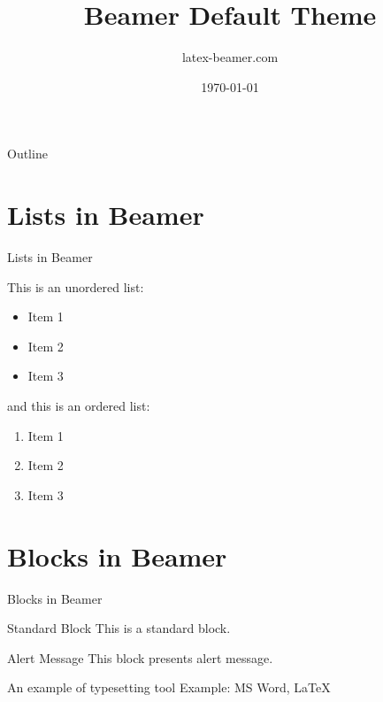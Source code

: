 \documentclass{beamer}
\title{Beamer Default Theme}
\author{latex-beamer.com}
\date{\today}
\begin{document}
\begin{frame}
    \titlepage 
\end{frame}

\logo{}

\begin{frame}{Outline}
    \tableofcontents
\end{frame}

\section{Lists in Beamer}
\begin{frame}{Lists in Beamer}

This is an unordered list:
\begin{itemize}
    \item Item 1
    \item Item 2
    \item Item 3
\end{itemize}

and this is an ordered list:
\begin{enumerate}
    \item Item 1
    \item Item 2
    \item Item 3
\end{enumerate}

\end{frame}

\section{Blocks in Beamer}
\begin{frame}{Blocks in Beamer}
    \begin{block}{Standard Block}
        This is a standard block.
    \end{block}
    \begin{alertblock}{Alert Message}
        This block presents alert message.
    \end{alertblock}
    \begin{exampleblock}{An example of typesetting tool}
        Example: MS Word, \LaTeX{}
    \end{exampleblock}
\end{frame} 
\end{document}
